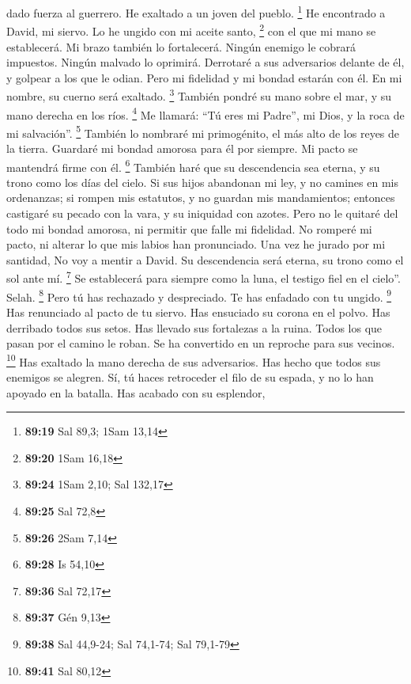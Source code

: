 \begin{paracol}{2}
dado fuerza al guerrero. He exaltado a un joven del pueblo. \footnote{\textbf{89:19}
  Sal 89,3; 1Sam 13,14}  He encontrado a David, mi
siervo. Lo he ungido con mi aceite santo, \footnote{\textbf{89:20} 1Sam
  16,18}  con el que mi mano se establecerá. Mi brazo
también lo fortalecerá.  Ningún enemigo le cobrará
impuestos. Ningún malvado lo oprimirá.  Derrotaré a sus
adversarios delante de él, y golpear a los que le odian. 
Pero mi fidelidad y mi bondad estarán con él. En mi nombre, su cuerno
será exaltado. \footnote{\textbf{89:24} 1Sam 2,10; Sal 132,17}
 También pondré su mano sobre el mar, y su mano derecha
en los ríos. \footnote{\textbf{89:25} Sal 72,8}  Me
llamará: ``Tú eres mi Padre'', mi Dios, y la roca de mi salvación''.
\footnote{\textbf{89:26} 2Sam 7,14}  También lo nombraré
mi primogénito, el más alto de los reyes de la tierra. 
Guardaré mi bondad amorosa para él por siempre. Mi pacto se mantendrá
firme con él. \footnote{\textbf{89:28} Is 54,10}  También
haré que su descendencia sea eterna, y su trono como los días del cielo.
 Si sus hijos abandonan mi ley, y no camines en mis
ordenanzas;  si rompen mis estatutos, y no guardan mis
mandamientos;  entonces castigaré su pecado con la vara,
y su iniquidad con azotes.  Pero no le quitaré del todo
mi bondad amorosa, ni permitir que falle mi fidelidad. 
No romperé mi pacto, ni alterar lo que mis labios han pronunciado.
 Una vez he jurado por mi santidad, No voy a mentir a
David.  Su descendencia será eterna, su trono como el sol
ante mí. \footnote{\textbf{89:36} Sal 72,17}  Se
establecerá para siempre como la luna, el testigo fiel en el cielo''.
Selah. \footnote{\textbf{89:37} Gén 9,13}  Pero tú has
rechazado y despreciado. Te has enfadado con tu ungido. \footnote{\textbf{89:38}
  Sal 44,9-24; Sal 74,1-74; Sal 79,1-79}  Has renunciado
al pacto de tu siervo. Has ensuciado su corona en el polvo.
 Has derribado todos sus setos. Has llevado sus
fortalezas a la ruina.  Todos los que pasan por el camino
le roban. Se ha convertido en un reproche para sus vecinos. \footnote{\textbf{89:41}
  Sal 80,12}  Has exaltado la mano derecha de sus
adversarios. Has hecho que todos sus enemigos se alegren.
 Sí, tú haces retroceder el filo de su espada, y no lo
han apoyado en la batalla.  Has acabado con su esplendor,

\end{paracol}
